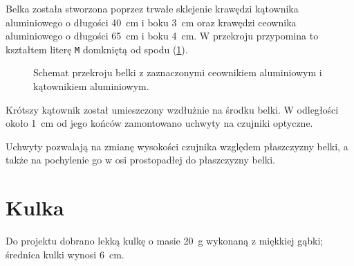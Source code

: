 Belka została stworzona poprzez trwałe sklejenie krawędzi kątownika aluminiowego o długości \SI[mode=text]{40}{cm} i boku \SI[mode=text]{3}{cm} oraz krawędzi ceownika aluminiowego o długości \SI[mode=text]{65}{cm} i boku \SI[mode=text]{4}{cm}. W przekroju przypomina to kształtem literę \texttt{M} domkniętą od spodu (\cref{fig:przekroj_belki}).

\begin{figure}[H]
	\centering
	
	\caption{Schemat przekroju belki z zaznaczonymi ceownikiem aluminiowym i kątownikiem aluminiowym.}
	\label{fig:przekroj_belki}
\end{figure}

Krótszy kątownik został umieszczony wzdłużnie na środku belki. W odległości około \SI[mode=text]{1}{cm} od jego końców zamontowano uchwyty na czujniki optyczne.

Uchwyty pozwalają na zmianę wysokości czujnika względem płaszczyzny belki, a także na pochylenie go w osi prostopadłej do płaszczyzny belki.


\section{Kulka}

Do projektu dobrano lekką kulkę o masie \SI[mode=text]{20}{g} wykonaną z miękkiej gąbki; średnica kulki wynosi \SI[mode=text]{6}{cm}.

